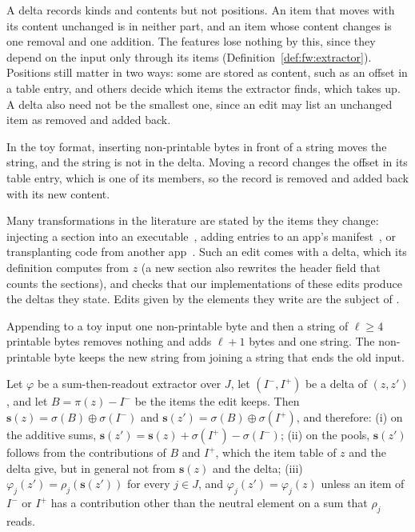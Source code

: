 \noindent A delta records kinds and contents but not positions. An item that moves with its content unchanged is in
neither part, and an item whose content changes is one removal and one addition. The features lose nothing by this,
since they depend on the input only through its items (Definition~\ref{def:fw:extractor}). Positions still matter in
two ways: some are stored as content, such as an offset in a table entry, and others decide which items the extractor
finds, which  takes up. A delta also need not be the smallest one, since an edit may list an
unchanged item as removed and added back.
\begin{runex}
In the toy format, inserting non-printable bytes in front of a string moves the string, and the string is not in the delta. Moving
a record changes the offset in its table entry, which is one of its members, so the record is removed and added back
with its new content.
\end{runex}

Many transformations in the literature are stated by the items they change: injecting a section into an
executable~\cite{demetrio2021functionality}, adding entries to an app's manifest~\cite{grosse2016adversarialTMP}, or
transplanting code from another app~\cite{pierazzi2020intriguing}. Such an edit comes with a delta, which its
definition computes from $z$ (a new section also rewrites the header field that counts the sections), and
 checks that our implementations of these edits produce the deltas they state. Edits given by the
elements they write are the subject of .
\begin{runex}
Appending to a toy input one non-printable byte and then a string of $\ell \ge 4$ printable bytes removes nothing and
adds $\ell + 1$ bytes and one string. The non-printable byte keeps the new string from joining a string that ends the
old input.
\end{runex}

\label{prop:fw:side-effects}
{
Let $\varphi$ be a sum-then-readout extractor over $J$, let $(I^-, I^+)$ be a delta of $(z, z')$, and let
$B = \pi(z) - I^-$ be the items the edit keeps. Then $\mathbf{s}(z) = \sigma(B) \oplus \sigma(I^-)$ and
$\mathbf{s}(z') = \sigma(B) \oplus \sigma(I^+)$, and therefore:
(i) on the additive sums, $\mathbf{s}(z') = \mathbf{s}(z) + \sigma(I^+) - \sigma(I^-)$;
(ii) on the pools, $\mathbf{s}(z')$ follows from the contributions of $B$ and $I^+$, which the item table of $z$ and
the delta give, but in general not from $\mathbf{s}(z)$ and the delta;
(iii) $\varphi_j(z') = \rho_j(\mathbf{s}(z'))$ for every $j \in J$, and $\varphi_j(z') = \varphi_j(z)$ unless an
item of $I^-$ or $I^+$ has a contribution other than the neutral element on a sum that $\rho_j$ reads.
}

